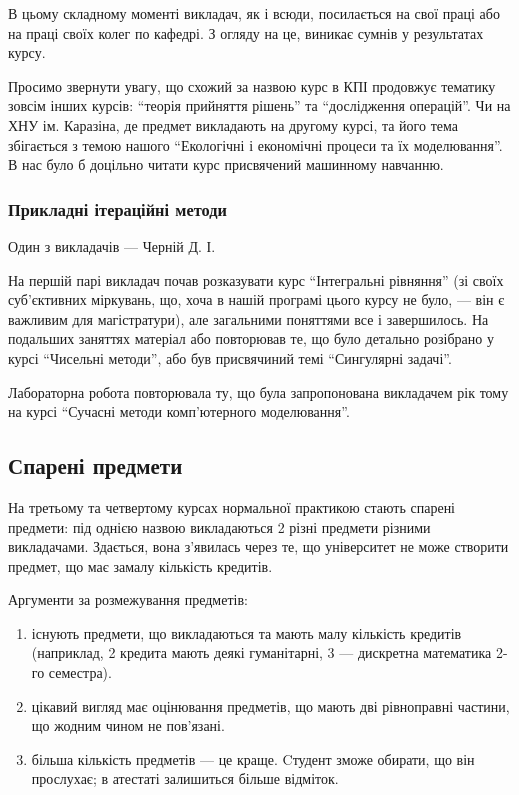 \documentclass[14pt, a4paper]{extarticle}  %
\begin{document}
В цьому складному моменті викладач, як і всюди, посилається на свої праці або на праці своїх колег по кафедрі. З огляду на це, виникає сумнів у результатах курсу. \medskip

Просимо звернути увагу, що схожий за назвою курс в КПІ продовжує тематику зовсім інших курсів: ``теорія прийняття рішень'' та ``дослідження операцій''. Чи на ХНУ ім. Каразіна, де предмет викладають на другому курсі, та його тема збігається з темою нашого ``Екологічні і економічні процеси та їх моделювання''. В нас було б доцільно читати курс присвячений машинному навчанню. 

\subsubsection{Прикладні ітераційні методи}
Один з викладачів --- Черній Д. І.

На першій парі викладач почав розказувати курс ``Інтегральні рівняння'' (зі своїх суб'єктивних міркувань, що, хоча в нашій програмі цього курсу не було, --- він є важливим для магістратури), але загальними поняттями все і завершилось. На подальших заняттях матеріал або повторював те, що було детально розібрано у курсі ``Чисельні методи'', або був присвячиний темі ``Сингулярні задачі''.

Лабораторна робота повторювала ту, що була запропонована викладачем рік тому на курсі ``Сучасні методи комп'ютерного моделювання''. 

\subsection{Спарені предмети}
\label{conjunctions}
На третьому та четвертому курсах нормальної практикою стають спарені предмети: під однією назвою викладаються 2 різні предмети різними викладачами. Здається, вона з'явилась через те, що університет не може створити предмет, що має замалу кількість кредитів. 

Аргументи за розмежування предметів:
\begin{enumerate}
    \item існують предмети, що викладаються та мають малу кількість кредитів (наприклад, 2 кредита мають деякі гуманітарні, 3 --- дискретна математика 2-го семестра). 
    \item цікавий вигляд має оцінювання предметів, що мають дві рівноправні частини, що жодним чином не пов'язані.  
    \item більша кількість предметів --- це краще. Cтудент зможе обирати, що він прослухає; в атестаті залишиться більше відміток.
\end{enumerate}
\end{document}
